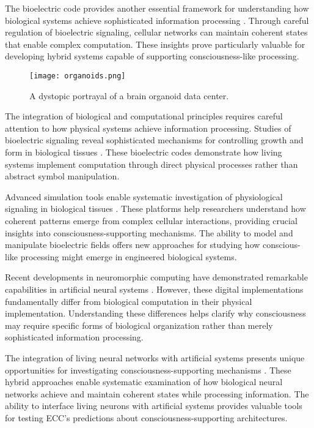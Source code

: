 The bioelectric code provides another essential framework for understanding how biological systems achieve sophisticated information processing \cite{Levin2018}. Through careful regulation of bioelectric signaling, cellular networks can maintain coherent states that enable complex computation. These insights prove particularly valuable for developing hybrid systems capable of supporting consciousness-like processing.

\begin{figure}[h]
    \centering
    \texttt{[image: organoids.png]}

    \caption{A dystopic portrayal of a brain organoid data center.}
\end{figure}

The integration of biological and computational principles requires careful attention to how physical systems achieve information processing. Studies of bioelectric signaling reveal sophisticated mechanisms for controlling growth and form in biological tissues \cite{Levin2018}. These bioelectric codes demonstrate how living systems implement computation through direct physical processes rather than abstract symbol manipulation.

Advanced simulation tools enable systematic investigation of physiological signaling in biological tissues \cite{Pietak2017}. These platforms help researchers understand how coherent patterns emerge from complex cellular interactions, providing crucial insights into consciousness-supporting mechanisms. The ability to model and manipulate bioelectric fields offers new approaches for studying how conscious-like processing might emerge in engineered biological systems.

Recent developments in neuromorphic computing have demonstrated remarkable capabilities in artificial neural systems \cite{Merolla2014}. However, these digital implementations fundamentally differ from biological computation in their physical implementation. Understanding these differences helps clarify why consciousness may require specific forms of biological organization rather than merely sophisticated information processing.

The integration of living neural networks with artificial systems presents unique opportunities for investigating consciousness-supporting mechanisms \cite{DeMarse2005}. These hybrid approaches enable systematic examination of how biological neural networks achieve and maintain coherent states while processing information. The ability to interface living neurons with artificial systems provides valuable tools for testing ECC's predictions about consciousness-supporting architectures.

